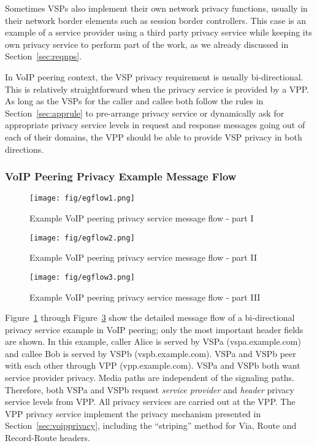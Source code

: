 \documentclass[letterpaper,notitlepage,times,12pt]{article}
\begin{document}
Sometimes VSPs also implement their own network privacy functions, usually in their network border elements such as session border controllers. This case is an example of a service provider using a third party privacy service while keeping its own privacy service to perform part of the work, as we already discussed in Section~\ref{sec:reqnps}.

In VoIP peering context, the VSP privacy requirement is usually bi-directional. This is relatively straightforward when the privacy service is provided by a VPP. As long as the VSPs for the caller and callee both follow the rules in Section~\ref{sec:apprule} to pre-arrange privacy service or dynamically ask for appropriate privacy service levels in request and response messages going out of each of their domains, the VPP should be able to provide VSP privacy in both directions.










\subsubsection{VoIP Peering Privacy Example Message Flow}

\begin{figure}[tph]
\centerline{
    \texttt{[image: fig/egflow1.png]}
}
\caption{Example VoIP peering privacy service message flow - part I}\label{fig:egflow1}
\end{figure}

\begin{figure}[tph]
\centerline{
    \texttt{[image: fig/egflow2.png]}
}
\caption{Example VoIP peering privacy service message flow - part II}\label{fig:egflow2}
\end{figure}

\begin{figure}[tph]
\centerline{
    \texttt{[image: fig/egflow3.png]}
}
\caption{Example VoIP peering privacy service message flow - part III}\label{fig:egflow3}
\end{figure}

Figure~\ref{fig:egflow1} through Figure~\ref{fig:egflow3} show the detailed message flow of a bi-directional privacy service example in VoIP peering; only the most important header fields are shown. In this example, caller Alice is served by VSPa (vspa.example.com) and callee Bob is served by VSPb (vspb.example.com). VSPa and VSPb peer with each other through VPP (vpp.example.com). VSPa and VSPb both want service provider privacy. Media paths are independent of the signaling paths. Therefore, both VSPa and VSPb request {\it service provider} and {\it header} privacy service levels from VPP. All privacy services are carried out at the VPP. The VPP privacy service implement the privacy mechanism presented in Section~\ref{sec:voipprivacy}, including the ``striping'' method for {\sf Via}, {\sf Route} and {\sf Record-Route} headers. 
\end{document}
